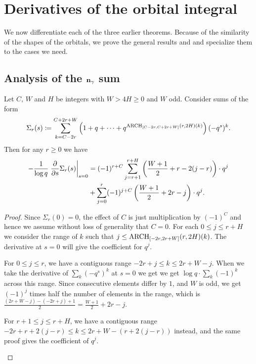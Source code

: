 \section{Derivatives of the orbital integral}
\label{sec:S3_orbital_deriv}

We now differentiate each of the three earlier theorems.
Because of the similarity of the shapes of the orbitals,
we prove the general results  and 
and specialize them to the cases we need.

\subsection{Analysis of the $\mathbf n_\gamma$ sum}
\begin{lemma}
  \label{lem:derivative_nn}
  Let $C$, $W$ and $H$ be integers with $W > 4H \ge 0$ and $W$ odd.
  Consider sums of the form
  \[ \Sigma_r(s) \coloneqq \sum_{k=C-2r}^{C+2r+W} \left( 1 + q + \dots
    + q^{\operatorname*{ARCH}_{[C-2r, C+2r+W]}(r, 2H)(k)} \right) (-q^s)^k. \]
  Then for any $r \ge 0$ we have
  \begin{align*}
    - \frac{1}{\log q} \left. \pdv{}{s} \Sigma_r(s) \right\rvert_{s=0}
    &= (-1)^{r+C} \sum_{j=r+1}^{r+H} \left( \frac{W+1}{2} + r - 2(j-r) \right) \cdot q^j \\
      &+ \sum_{j=0}^{r} (-1)^{j+C} \left( \frac{W+1}{2} + 2r - j \right) \cdot q^j.
  \end{align*}
\end{lemma}
\begin{proof}
  Since $\Sigma_r(0) = 0$, the effect of $C$ is just multiplication by $(-1)^C$
  and hence we assume without loss of generality that $C = 0$.
  For each $0 \le j \le r+H$ we consider the range of $k$
  such that $j \le \operatorname*{ARCH}_{[-2r, 2r+W]}(r, 2H)(k)$.
  The derivative at $s = 0$ will give the coefficient for $q^j$.
  \begin{itemize}
    \ii For $0 \le j \le r$, we have a contiguous range $-2r + j \le k \le 2r+W-j$.
    When we take the derivative of $\sum_k (-q^s)^k$ at $s = 0$ we get
    we get $\log q \cdot \sum_k (-1)^k$ across this range.
    Since consecutive elements differ by $1$, and $W$ is odd,
    we get $(-1)^j$ times half the number of elements in the range,
    which is $\frac{(2r+W-j) - (-2r+j) + 1}{2} = \frac{W+1}{2} + 2r - j$.

    \ii For $r+1 \le j \le r+H$, we have a contiguous range
    $-2r + r + 2(j-r) \le k \le 2r+W-(r + 2(j-r))$ instead,
    and the same proof gives the coefficient of $q^j$.
    \qedhere
  \end{itemize}
\end{proof}

